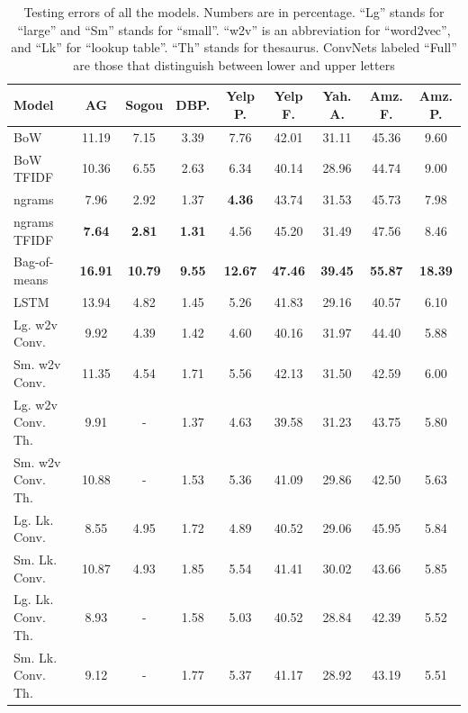 \documentclass{article} %
\begin{document}
\begin{table}[t]
  \caption{Testing errors of all the models. Numbers are in percentage. ``Lg'' stands for ``large'' and ``Sm'' stands for ``small''. ``w2v'' is an abbreviation for ``word2vec'', and ``Lk'' for ``lookup table''. ``Th'' stands for thesaurus. ConvNets labeled ``Full'' are those that distinguish between lower and upper letters}
  \label{tab:rslt}
  \begin{center}
    \begin{tabular}{lcccccccc}
      Model & AG & Sogou & DBP. & Yelp P. & Yelp F. & Yah. A. & Amz. F. & Amz. P. \\
      \hline
      BoW & 11.19 & 7.15 & 3.39 & 7.76 & 42.01 & 31.11 & 45.36 & 9.60 \\
      BoW TFIDF & 10.36 & 6.55 & 2.63 & 6.34 & 40.14 & 28.96 & 44.74 & 9.00 \\
      ngrams & 7.96 & 2.92 & 1.37 & \color{blue}\textbf{4.36} & 43.74 & 31.53 & 45.73 & 7.98 \\
      ngrams TFIDF & \color{blue}\textbf{7.64} & \color{blue}\textbf{2.81} & \color{blue}\textbf{1.31} & 4.56 & 45.20 & 31.49 & 47.56 & 8.46 \\
      Bag-of-means & \color{red}\textbf{16.91} & \color{red}\textbf{10.79} & \color{red}\textbf{9.55} & \color{red}\textbf{12.67} & \color{red}\textbf{47.46} & \color{red}\textbf{39.45} & \color{red}\textbf{55.87} & \color{red}\textbf{18.39} \\
      LSTM & 13.94 & 4.82 & 1.45 & 5.26 & 41.83 & 29.16 & 40.57 & 6.10 \\
      Lg. w2v Conv. & 9.92 & 4.39 & 1.42 & 4.60 & 40.16 & 31.97 & 44.40 & 5.88 \\
      Sm. w2v Conv. & 11.35 & 4.54 & 1.71 & 5.56 & 42.13 & 31.50 & 42.59 & 6.00 \\
      Lg. w2v Conv. Th. & 9.91 & - & 1.37 & 4.63 & 39.58 & 31.23 & 43.75 & 5.80 \\
      Sm. w2v Conv. Th. & 10.88 & - & 1.53 & 5.36 & 41.09 & 29.86 & 42.50 & 5.63 \\
      Lg. Lk. Conv. & 8.55 & 4.95 & 1.72 & 4.89 & 40.52 & 29.06 & 45.95 & 5.84 \\
      Sm. Lk. Conv. & 10.87 & 4.93 & 1.85 & 5.54 & 41.41 & 30.02 & 43.66 & 5.85 \\
      Lg. Lk. Conv. Th. & 8.93 & - & 1.58 & 5.03 & 40.52 & 28.84 & 42.39 & 5.52 \\
      Sm. Lk. Conv. Th. & 9.12 & - & 1.77 & 5.37 & 41.17 & 28.92 & 43.19 & 5.51 \\

\end{tabular}
\end{center}
\end{table}
\end{document}
